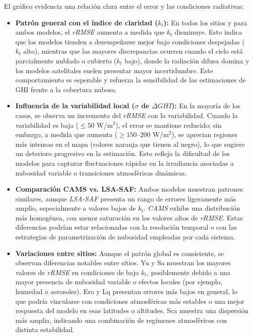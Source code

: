 \documentclass[letterpaper,12pt, twoside]{report}
\providecommand{\DIFdeltex}[1]{{\protect\color{red} \scriptsize #1}} %
\providecommand{\DIFdel}[1]{\texorpdfstring{\DIFdeltex{#1}}{}} %
\begin{document}
\DIFdel{El gráfico evidencia una relación clara entre el error y las condiciones radiativas:
}%

\begin{itemize}%
\item%
\DIFdel{\textbf{Patrón general con el índice de claridad ($k_t$):} En todos los sitios y para ambos modelos, el \textit{rRMSE} aumenta a medida que $k_t$ disminuye. Esto indica que los modelos tienden a desempeñarse mejor bajo condiciones despejadas ($k_t$ alto), mientras que las mayores discrepancias ocurren cuando el cielo está parcialmente nublado o cubierto ($k_t$ bajo), donde la radiación difusa domina y los modelos satelitales suelen presentar mayor incertidumbre. Este comportamiento es esperable y refuerza la sensibilidad de las estimaciones de GHI frente a la cobertura nubosa.
}%

\item%
\DIFdel{\textbf{Influencia de la variabilidad local ($\sigma$ de $\Delta GHI$):} En la mayoría de los casos, se observa un incremento del \textit{rRMSE} con la variabilidad. Cuando la variabilidad es baja ($\leq 50$ W/m$^2$), el error se mantiene reducido; sin embargo, a medida que aumenta ($\geq 150$–$200$ W/m$^2$), se aprecian regiones más intensas en el mapa (colores naranja que tienen al negro), lo que sugiere un deterioro progresivo en la estimación. Esto refleja la dificultad de los modelos para capturar fluctuaciones rápidas en la irradiancia asociadas a nubosidad variable o transiciones atmosféricas dinámicas.
}%

\item%
\DIFdel{\textbf{Comparación CAMS vs. LSA-SAF:} Ambos modelos muestran patrones similares, aunque \textit{LSA-SAF} presenta un rango de errores ligeramente más amplio, especialmente a valores bajos de $k_t$. \textit{CAMS} exhibe una distribución más homogénea, con menor saturación en los valores altos de \textit{rRMSE}. Estas diferencias podrían estar relacionadas con la resolución temporal o con las estrategias de parametrización de nubosidad empleadas por cada sistema.
}%

\item%
\DIFdel{\textbf{Variaciones entre sitios:} Aunque el patrón global es consistente, se observan diferencias notables entre sitios. Yu y Sa muestran los mayores valores de \textit{rRMSE} en condiciones de bajo $k_t$, posiblemente debido a una mayor presencia de nubosidad variable o efectos locales (por ejemplo, humedad o aerosoles). Ero y Lq presentan errores más bajos en general, lo que podría vincularse con condiciones atmosféricas más estables o una mejor respuesta del modelo en esas latitudes o altitudes. Sca muestra una dispersión más amplia, indicando una combinación de regímenes atmosféricos con distinta estabilidad.
}%


\end{itemize}
\end{document}
